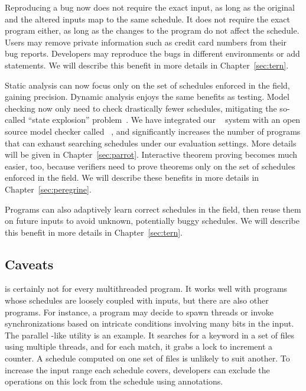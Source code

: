  Reproducing a bug now does not require the exact input,
as long as the original and the altered inputs map to the same schedule.
It does not require the exact program either, as long as the changes to
the program do not affect the schedule.  Users may remove private
information such as credit card numbers from their bug reports. Developers
may reproduce the bugs in different environments or add 
statements. We will describe this benefit in more details in
Chapter~\ref{sec:tern}.

 Static analysis can now focus
only on the set of schedules enforced in the field, gaining
precision.  Dynamic analysis enjoys the same benefits as testing.  Model
checking now only need to check drastically fewer schedules, mitigating the
so-called ``state explosion'' problem~\cite{clarke:ModelChecking}. We have
integrated our \parrot~\cite{parrot:sosp13} system with an open source model
checker called \dbug~\cite{dbug:spin11}, and \parrot significantly increases the
number of programs that \dbug can exhaust searching schedules under our
evaluation settings. More details will be given in Chapter~\ref{sec:parrot}.
Interactive theorem proving becomes much easier, too, because verifiers
need to prove theorems only on the set of schedules enforced in the field.  We
will describe these benefits in more details in Chapter~\ref{sec:peregrine}.

  Programs can also adaptively learn correct
schedules in the field, then reuse them on future inputs to avoid unknown,
potentially buggy schedules.  We will describe this benefit in more
details in Chapter~\ref{sec:tern}.

\subsection{Caveats}

\smt is certainly not for every multithreaded program.  It works well with
programs whose schedules are loosely coupled with inputs, but there are also
other programs.  For instance, a program may decide to spawn
threads or invoke synchronizations based on intricate conditions involving many
bits in the input. The parallel -like utility \pfscan is an example. 
It
searches for a keyword in a set of files using multiple threads, and for each
match, it grabs a lock to increment a counter.  A schedule computed on one set
of files is unlikely to suit another. To increase the input range each schedule
covers, developers can exclude the operations on this lock from the schedule
using annotations.


